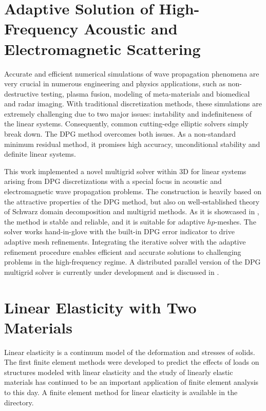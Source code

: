 \section{Adaptive Solution of High-Frequency Acoustic and Electromagnetic Scattering}
\label{sec:adaptive}

Accurate and efficient numerical simulations of wave propagation phenomena are very crucial in numerous engineering and physics applications, such as non-destructive testing, plasma fusion, modeling of meta-materials and biomedical and radar imaging. With traditional discretization methods, these simulations are extremely challenging due to two major issues: instability and indefiniteness of the linear systems. Consequently, common cutting-edge elliptic solvers simply break down. The DPG method overcomes both issues. As a non-standard minimum residual method, it promises high accuracy, unconditional stability and definite linear systems.

This work implemented a novel multigrid solver within \hp3D for linear systems arising from DPG discretizations with a special focus in acoustic and electromagnetic wave propagation problems. The construction is heavily based on the attractive properties of the DPG method, but also on well-established theory of Schwarz domain decomposition and multigrid methods. As it is showcased in \cite{petrides2019phd,petrides2021adaptive,petrides2017adaptive}, the method is stable and reliable, and it is suitable for adaptive $hp$-meshes. The solver works hand-in-glove with the built-in DPG error indicator to drive adaptive mesh refinements. Integrating the iterative solver with the adaptive refinement procedure enables efficient and accurate solutions to challenging problems in the high-frequency regime. A distributed parallel version of the DPG multigrid solver is currently under development and is discussed in \cite{badger2023scalable}.

\section{Linear Elasticity with Two Materials}
\label{sec:hose}

Linear elasticity is a continuum model of the deformation and stresses of solids. The first finite element methods were developed to predict the effects of loads on structures modeled with linear elasticity and the study of linearly elastic materials has continued to be an important application of finite element analysis to this day. A finite element method for linear elasticity is available in the  directory.

